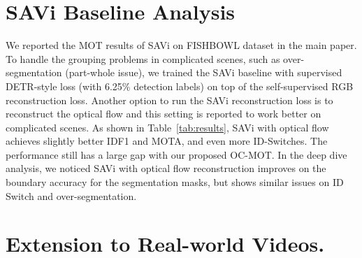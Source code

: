 \documentclass[10pt,twocolumn,letterpaper]{article}
\begin{document}
\begin{appendices}
\begin{table}[!ht]
	\centering
{}
\caption{\textbf{Comparison with video object-centric models on FISHBOWL}. The SAVi models are trained with RGB reconstruction and optical flow reconstruction, respectively.}
	\label{tab:results}
\end{table}

\section{SAVi Baseline Analysis}
We reported the MOT results of SAVi on FISHBOWL dataset in the main paper. To handle the grouping problems in complicated scenes, such as over-segmentation (part-whole issue),  we trained the SAVi baseline with supervised DETR-style loss (with 6.25\% detection labels) on top of the self-supervised RGB reconstruction loss. 
 Another option to run the SAVi reconstruction loss is to reconstruct the optical flow and this setting is reported to work better on complicated scenes. As shown in Table~\ref{tab:results}, SAVi with optical flow achieves slightly better IDF1 and MOTA, and even more ID-Switches. The performance still has a large gap with our proposed OC-MOT. In the deep dive analysis, we noticed SAVi with optical flow reconstruction improves on the boundary accuracy for the segmentation masks, but shows similar issues on ID Switch and over-segmentation.

\section{Extension to Real-world Videos.}


\end{appendices}
\end{document}
